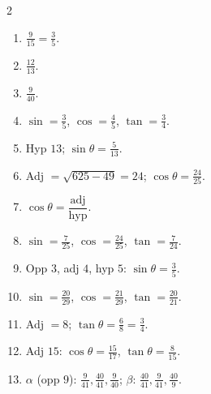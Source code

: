 \documentclass[11pt]{article}
\begin{document}
\begin{keybox}
\begin{multicols}{2}
\small
\begin{enumerate}[leftmargin=*,itemsep=3pt]
  \item $\tfrac{9}{15}=\tfrac35$.
  \item $\tfrac{12}{13}$.
  \item $\tfrac{9}{40}$.
  \item $\sin=\tfrac35$, $\cos=\tfrac45$, $\tan=\tfrac34$.
  \item Hyp $13$; $\sin\theta=\tfrac{5}{13}$.
  \item Adj $=\sqrt{625-49}=24$; $\cos\theta=\tfrac{24}{25}$.
  \item $\cos\theta=\dfrac{\text{adj}}{\text{hyp}}$.
  \item $\sin=\tfrac{7}{25}$, $\cos=\tfrac{24}{25}$, $\tan=\tfrac{7}{24}$.
  \item Opp $3$, adj $4$, hyp $5$: $\sin\theta=\tfrac35$.
  \item $\sin=\tfrac{20}{29}$, $\cos=\tfrac{21}{29}$, $\tan=\tfrac{20}{21}$.
  \item Adj $=8$; $\tan\theta=\tfrac68=\tfrac34$.
  \item Adj $15$: $\cos\theta=\tfrac{15}{17}$, $\tan\theta=\tfrac{8}{15}$.
  \item $\alpha$ (opp $9$): $\tfrac{9}{41},\tfrac{40}{41},\tfrac{9}{40}$; $\beta$: $\tfrac{40}{41},\tfrac{9}{41},\tfrac{40}{9}$.
\end{enumerate}
\end{multicols}
\end{keybox}
\end{document}
